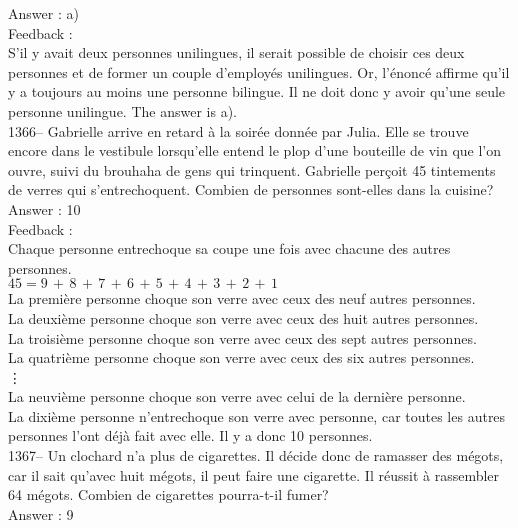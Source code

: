 ﻿\documentclass[letterpaper, 12pt]{article}
\begin{document}
Answer : a)\\

Feedback : \\
S'il y avait deux personnes unilingues, il serait possible de choisir ces
deux personnes et de former un couple d'employ\'es unilingues.  Or,
l'\'enonc\'e affirme qu'il y a toujours au moins une personne bilingue.  Il
ne doit donc y avoir qu'une seule personne unilingue.  The answer is
a).\\

1366-- Gabrielle arrive en retard \`a la soir\'ee donn\'ee par Julia.  Elle
se trouve encore dans le vestibule lorsqu'elle entend le plop d'une
bouteille de vin que l'on ouvre, suivi du brouhaha de gens qui trinquent.
Gabrielle per\c coit 45 tintements de verres qui s'entrechoquent.  Combien
de personnes sont-elles dans la cuisine?\\

Answer : 10\\

Feedback :\\
Chaque personne entrechoque sa coupe une fois avec chacune des autres
personnes.  \\
$45=9\,+\,8\,+\,7\,+\,6\,+\,5\,+\,4\,+\,3\,+\,2\,+\,1$\\
La premi\`ere personne choque son verre avec ceux des neuf autres
personnes.\\
La deuxi\`eme personne choque son verre avec ceux des huit autres
personnes.\\
La troisi\`eme personne choque son verre avec ceux des sept autres
personnes.\\
La quatri\`eme personne choque son verre avec ceux des six autres
personnes.\\
\vdots\\
La neuvi\`eme personne choque son verre avec celui de la derni\`ere
personne.\\
La dixi\`eme personne n'entrechoque son verre avec personne, car toutes les
autres personnes l'ont d\'ej\`a fait avec elle.  Il y a donc 10 personnes.\\

1367-- Un clochard n'a plus de cigarettes.  Il d\'ecide donc de ramasser des
m\'egots, car il sait qu'avec huit m\'egots, il peut faire une cigarette.
Il r\'eussit \`a rassembler 64 m\'egots.  Combien de cigarettes pourra-t-il
fumer?\\

Answer : 9\\
\end{document}

